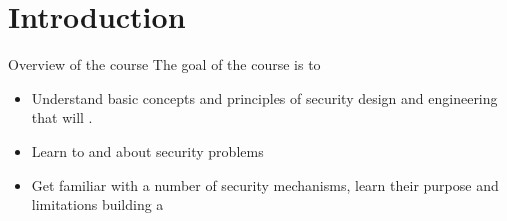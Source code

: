 \documentclass[a4paper]{book}
\begin{document}
\newpage


\tableofcontents
\newpage

\section*{Introduction}
\begin{parag}{Overview of the course}
	The goal of the course is to 
	\begin{itemize}
	    \item Understand basic concepts and principles of security design and engineering that will .
	    \item Learn to  and  about security problems 
			\begin{center}
			\end{center}
		\item Get familiar with a number of security mechanisms, learn their purpose and limitations building a 
	\end{itemize}
\end{parag}








\end{document}
